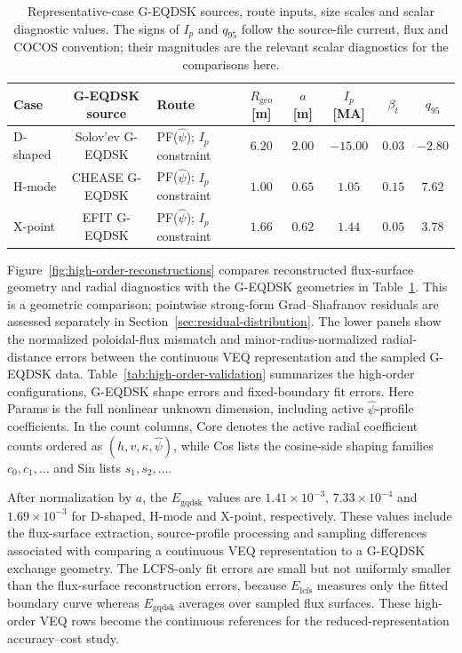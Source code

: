\documentclass[final, 3p, times]{elsarticle}
\newcommand{\tableformat}{\centering\small}
\begin{document}
\begin{table}[tb]
    \caption{Representative-case G-EQDSK sources, route inputs, size scales and scalar diagnostic values. The signs of $I_p$ and $q_{95}$ follow the source-file current, flux and COCOS convention; their magnitudes are the relevant scalar diagnostics for the comparisons here.}
    \tableformat
    \begin{tabular}{l c l c c c c c}
        \hline
        Case     & G-EQDSK source   & Route                              & $R_{\mathrm{geo}}$ [m] & $a$ [m] & $I_p$ [MA] & $\beta_t$ & $q_{95}$ \\
        \hline
        D-shaped & Solov'ev G-EQDSK & PF($\hat{\psi}$); $I_p$ constraint & $6.20$                 & $2.00$  & $-15.00$   & $0.03$    & $-2.80$  \\
        H-mode   & CHEASE G-EQDSK   & PF($\hat{\psi}$); $I_p$ constraint & $1.00$                 & $0.65$  & $1.05$     & $0.15$    & $7.62$   \\
        X-point  & EFIT G-EQDSK     & PF($\hat{\psi}$); $I_p$ constraint & $1.66$                 & $0.62$  & $1.44$     & $0.05$    & $3.78$   \\
        \hline
    \end{tabular}
    \label{tab:representative-route-inputs}
\end{table}

Figure~\ref{fig:high-order-reconstructions} compares reconstructed flux-surface geometry and radial diagnostics with the G-EQDSK geometries in Table~\ref{tab:representative-route-inputs}. This is a geometric comparison; pointwise strong-form Grad--Shafranov residuals are assessed separately in Section~\ref{sec:residual-distribution}. The lower panels show the normalized poloidal-flux mismatch and minor-radius-normalized radial-distance errors between the continuous VEQ representation and the sampled G-EQDSK data. Table~\ref{tab:high-order-validation} summarizes the high-order configurations, G-EQDSK shape errors and fixed-boundary fit errors. Here Params is the full nonlinear unknown dimension, including active $\hat{\psi}$-profile coefficients. In the count columns, Core denotes the active radial coefficient counts ordered as $(h,v,\kappa,\hat{\psi})$, while Cos lists the cosine-side shaping families $c_0,c_1,\ldots$ and Sin lists $s_1,s_2,\ldots$.

After normalization by $a$, the $E_{\mathrm{gqdsk}}$ values are $1.41\times 10^{-3}$, $7.33\times 10^{-4}$ and $1.69\times 10^{-3}$ for D-shaped, H-mode and X-point, respectively. These values include the flux-surface extraction, source-profile processing and sampling differences associated with comparing a continuous VEQ representation to a G-EQDSK exchange geometry. The LCFS-only fit errors are small but not uniformly smaller than the flux-surface reconstruction errors, because $E_{\mathrm{lcfs}}$ measures only the fitted boundary curve whereas $E_{\mathrm{gqdsk}}$ averages over sampled flux surfaces. These high-order VEQ rows become the continuous references for the reduced-representation accuracy--cost study.
\end{document}
